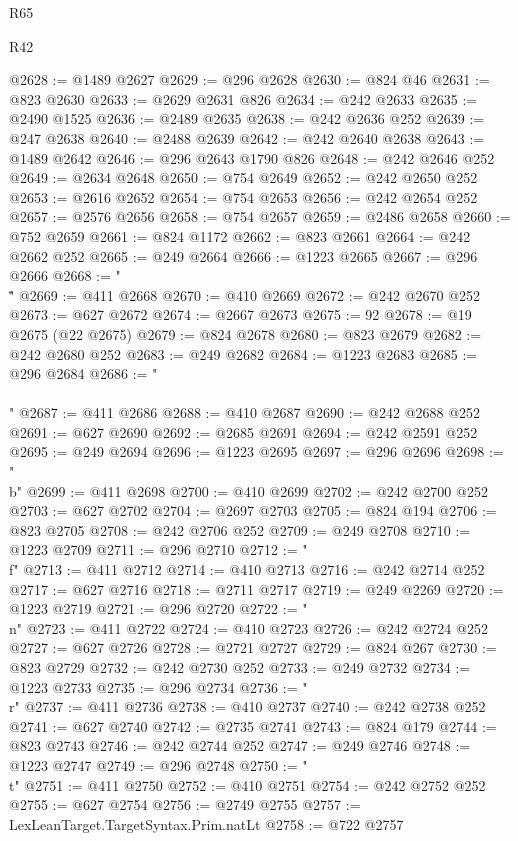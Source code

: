 \begin{lexlean}{R65}
\begin{lexlean}{R42}
\begin{coremodule}
{{{{{{{{{{{{{{{{{{{{{{{{{{{{{{{{{{{{{{{{{{{{{{{{{{{{{{{{{{{{{{{{{{{{{{{{{{{{{{{{{{{{{{{{{{{{{{{{{{{{{{{{{{{{{{{{{{{{{{{{{{{{{{{{{{{{{{{{{{{{{{{{{{{{{{{{{{{{{{{{{{{{{{{{{{{{{{{{{{{{{{{{@2628 := @1489 @2627
@2629 := @296 @2628
@2630 := @824 @46
@2631 := @823 @2630
@2633 := @2629 @2631 @826
@2634 := @242 @2633
@2635 := @2490 @1525
@2636 := @2489 @2635
@2638 := @242 @2636 @252
@2639 := @247 @2638
@2640 := @2488 @2639
@2642 := @242 @2640 @2638
@2643 := @1489 @2642
@2646 := @296 @2643 @1790 @826
@2648 := @242 @2646 @252
@2649 := @2634 @2648
@2650 := @754 @2649
@2652 := @242 @2650 @252
@2653 := @2616 @2652
@2654 := @754 @2653
@2656 := @242 @2654 @252
@2657 := @2576 @2656
@2658 := @754 @2657
@2659 := @2486 @2658
@2660 := @752 @2659
@2661 := @824 @1172
@2662 := @823 @2661
@2664 := @242 @2662 @252
@2665 := @249 @2664
@2666 := @1223 @2665
@2667 := @296 @2666
@2668 := "\\\""
@2669 := @411 @2668
@2670 := @410 @2669
@2672 := @242 @2670 @252
@2673 := @627 @2672
@2674 := @2667 @2673
@2675 := 92
@2678 := @19 @2675 (@22 @2675)
@2679 := @824 @2678
@2680 := @823 @2679
@2682 := @242 @2680 @252
@2683 := @249 @2682
@2684 := @1223 @2683
@2685 := @296 @2684
@2686 := "\\\\"
@2687 := @411 @2686
@2688 := @410 @2687
@2690 := @242 @2688 @252
@2691 := @627 @2690
@2692 := @2685 @2691
@2694 := @242 @2591 @252
@2695 := @249 @2694
@2696 := @1223 @2695
@2697 := @296 @2696
@2698 := "\\b"
@2699 := @411 @2698
@2700 := @410 @2699
@2702 := @242 @2700 @252
@2703 := @627 @2702
@2704 := @2697 @2703
@2705 := @824 @194
@2706 := @823 @2705
@2708 := @242 @2706 @252
@2709 := @249 @2708
@2710 := @1223 @2709
@2711 := @296 @2710
@2712 := "\\f"
@2713 := @411 @2712
@2714 := @410 @2713
@2716 := @242 @2714 @252
@2717 := @627 @2716
@2718 := @2711 @2717
@2719 := @249 @2269
@2720 := @1223 @2719
@2721 := @296 @2720
@2722 := "\\n"
@2723 := @411 @2722
@2724 := @410 @2723
@2726 := @242 @2724 @252
@2727 := @627 @2726
@2728 := @2721 @2727
@2729 := @824 @267
@2730 := @823 @2729
@2732 := @242 @2730 @252
@2733 := @249 @2732
@2734 := @1223 @2733
@2735 := @296 @2734
@2736 := "\\r"
@2737 := @411 @2736
@2738 := @410 @2737
@2740 := @242 @2738 @252
@2741 := @627 @2740
@2742 := @2735 @2741
@2743 := @824 @179
@2744 := @823 @2743
@2746 := @242 @2744 @252
@2747 := @249 @2746
@2748 := @1223 @2747
@2749 := @296 @2748
@2750 := "\\t"
@2751 := @411 @2750
@2752 := @410 @2751
@2754 := @242 @2752 @252
@2755 := @627 @2754
@2756 := @2749 @2755
@2757 := LexLeanTarget.TargetSyntax.Prim.natLt
@2758 := @722 @2757
}}}}}}}}}}}}}}}}}}}}}}}}}}}}}}}}}}}}}}}}}}}}}}}}}}}}}}}}}}}}}}}}}}}}}}}}}}}}}}}}}}}}}}}}}}}}}}}}}}}}}}}}}}}}}}}}}}}}}}}}}}}}}}}}}}}}}}}}}}}}}}}}}}}}}}}}}}}}}}}}}}}}}}}}}}}}}}}}}}}}}}}}
\end{coremodule}
\end{lexlean}
\end{lexlean}
